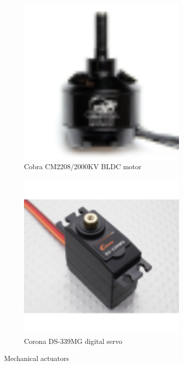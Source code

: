 \begin{figure}[htbp]
\begin{subfigure}{0.5\textwidth}
\centering
\includegraphics[width=0.9\textwidth]{figs/cobra-motor}
\caption{Cobra CM2208/2000KV BLDC motor~\cite{cobraimage}}
\label{fig:cobra}
\end{subfigure}
\begin{subfigure}{0.5\textwidth}
\centering
\includegraphics[width=0.9\textwidth]{figs/corona-servo}
\caption{Corona DS-339MG digital servo~\cite{hobbyking}}
\label{fig:corona}
\end{subfigure}
\caption{Mechanical actuators}
\vspace{-20pt}
\end{figure}

